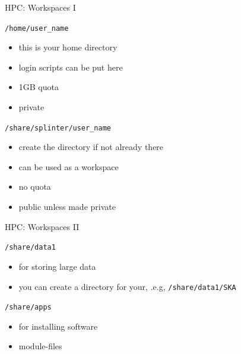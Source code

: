 \documentclass{beamer}
\begin{document}
\begin{frame}{HPC: Workspaces I}
	\begin{block}{\texttt{/home/user\_name}}
		\begin{itemize}
			\item this is your home directory
			\item login scripts can be put here
			\item 1GB quota
			\item private
		\end{itemize}
	\end{block}
	\begin{block}{\texttt{/share/splinter/user\_name}}
		\begin{itemize}
			\item create the directory if not already there
			\item can be used as a workspace
			\item no quota
			\item public unless made private
		\end{itemize}
	\end{block}
\end{frame}

\begin{frame}{HPC: Workspaces II}
	\begin{block}{\texttt{/share/data1}}
		\begin{itemize}
			\item for storing large data
			\item you can create a directory for your, .e.g, \texttt{/share/data1/SKA}
		\end{itemize}
	\end{block}

	\begin{block}{\texttt{/share/apps}}
		\begin{itemize}
			\item for installing software
			\item module-files
		\end{itemize}
	\end{block}
\end{frame}
\end{document}
